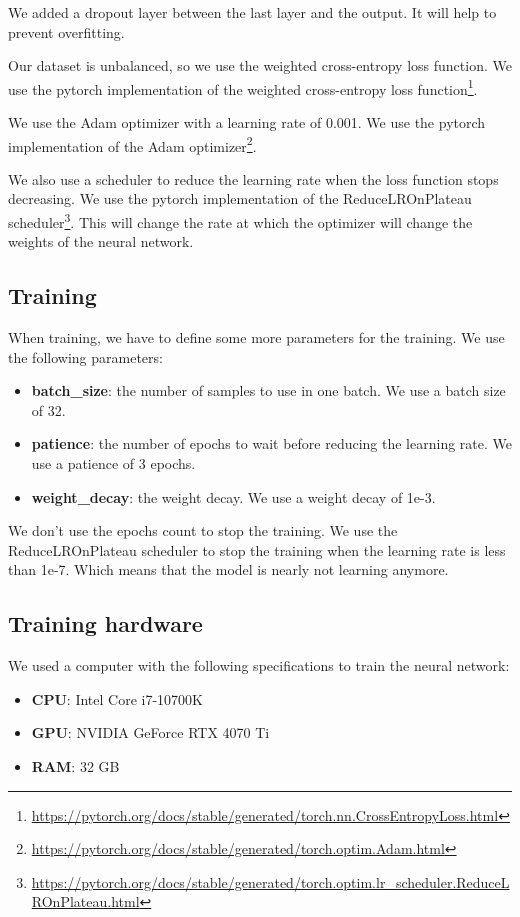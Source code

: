 We added a dropout layer between the last layer and the output. It will help to prevent overfitting. 

Our dataset is unbalanced, so we use the weighted cross-entropy loss function. We use the pytorch implementation of the weighted cross-entropy loss function\footnote{\url{https://pytorch.org/docs/stable/generated/torch.nn.CrossEntropyLoss.html}}.

We use the Adam optimizer with a learning rate of 0.001. We use the pytorch implementation of the Adam optimizer\footnote{\url{https://pytorch.org/docs/stable/generated/torch.optim.Adam.html}}.

We also use a scheduler to reduce the learning rate when the loss function stops decreasing. We use the pytorch implementation of the ReduceLROnPlateau scheduler\footnote{\url{https://pytorch.org/docs/stable/generated/torch.optim.lr_scheduler.ReduceLROnPlateau.html}}. This will change the rate at which the optimizer will change the weights of the neural network.

\subsection{Training}

When training, we have to define some more parameters for the training. We use the following parameters:

\begin{itemize}
    \item \textbf{batch\_size}: the number of samples to use in one batch. We use a batch size of 32.
    \item \textbf{patience}: the number of epochs to wait before reducing the learning rate. We use a patience of 3 epochs.
    \item \textbf{weight\_decay}: the weight decay. We use a weight decay of 1e-3.
\end{itemize}

We don't use the epochs count to stop the training. We use the ReduceLROnPlateau scheduler to stop the training when the learning rate is less than 1e-7. Which means that the model is nearly not learning anymore.

\subsection{Training hardware}
We used a computer with the following specifications to train the neural network:

\begin{itemize}
    \item \textbf{CPU}: Intel Core i7-10700K
    \item \textbf{GPU}: NVIDIA GeForce RTX 4070 Ti
    \item \textbf{RAM}: 32 GB
\end{itemize}


